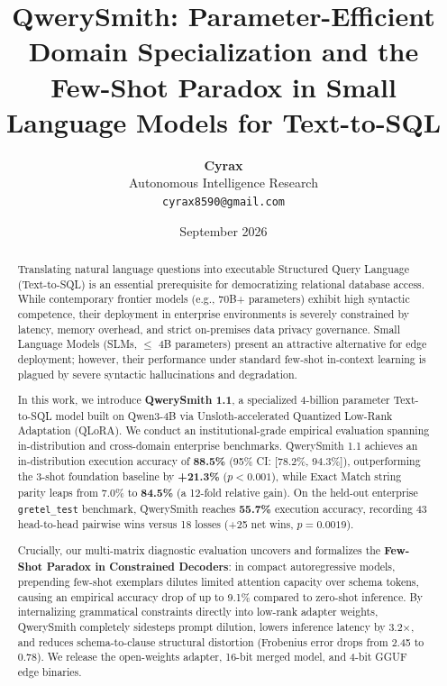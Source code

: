\documentclass[10pt,twocolumn,letterpaper]{article}
\title{\textbf{QwerySmith: Parameter-Efficient Domain Specialization and the Few-Shot Paradox in Small Language Models for Text-to-SQL}}
\author{
    \textbf{Cyrax} \\
    Autonomous Intelligence Research \\
    \texttt{cyrax8590@gmail.com}
}
\date{September 2026}
\theoremstyle{definition}
\begin{document}
\maketitle

\begin{abstract}
Translating natural language questions into executable Structured Query Language (Text-to-SQL) is an essential prerequisite for democratizing relational database access. While contemporary frontier models (e.g., 70B+ parameters) exhibit high syntactic competence, their deployment in enterprise environments is severely constrained by latency, memory overhead, and strict on-premises data privacy governance. Small Language Models (SLMs, $\le$ 4B parameters) present an attractive alternative for edge deployment; however, their performance under standard few-shot in-context learning is plagued by severe syntactic hallucinations and degradation. 

In this work, we introduce \textbf{QwerySmith 1.1}, a specialized 4-billion parameter Text-to-SQL model built on Qwen3-4B via Unsloth-accelerated Quantized Low-Rank Adaptation (QLoRA). We conduct an institutional-grade empirical evaluation spanning in-distribution and cross-domain enterprise benchmarks. QwerySmith 1.1 achieves an in-distribution execution accuracy of \textbf{88.5\%} (95\% CI: [78.2\%, 94.3\%]), outperforming the 3-shot foundation baseline by \textbf{+21.3\%} ($p < 0.001$), while Exact Match string parity leaps from 7.0\% to \textbf{84.5\%} (a 12-fold relative gain). On the held-out enterprise \texttt{gretel\_test} benchmark, QwerySmith reaches \textbf{55.7\%} execution accuracy, recording 43 head-to-head pairwise wins versus 18 losses (+25 net wins, $p = 0.0019$). 

Crucially, our multi-matrix diagnostic evaluation uncovers and formalizes the \textbf{Few-Shot Paradox in Constrained Decoders}: in compact autoregressive models, prepending few-shot exemplars dilutes limited attention capacity over schema tokens, causing an empirical accuracy drop of up to 9.1\% compared to zero-shot inference. By internalizing grammatical constraints directly into low-rank adapter weights, QwerySmith completely sidesteps prompt dilution, lowers inference latency by 3.2$\times$, and reduces schema-to-clause structural distortion (Frobenius error drops from 2.45 to 0.78). We release the open-weights adapter, 16-bit merged model, and 4-bit GGUF edge binaries.
\end{abstract}
\end{document}
